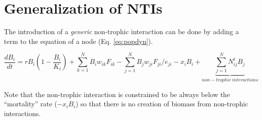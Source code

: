 \documentclass[a4paper,11pt]{article}
\begin{document}
  
  \section{Generalization of NTIs}
    
    The introduction of a \emph{generic} non-trophic interaction can be done 
by adding a term to the equation of a node (Eq. \ref{eq:popdyn}).
    
  \begin{equation}
    \label{eq:popdynt}
    \frac{dB_i}{dt} = rB_i(1 - \frac{B_i}{K_i})
                      + \sum_{k=1}^{N} B_i w_{ik} F_{ik}
                      - \sum_{j=1}^{N} B_j w_{ji} F_{ji} / e_{ji}
                      - x_i B_i 
                      + \underbrace{\sum_{j=1}^{N} N^t_{ij} B_j}_{non-trophic\ interactions}
  \end{equation}
    
    Note that the non-trophic interaction is constrained to be always below the 
``mortality'' rate ($- x_i B_i$) so that there is no creation of biomass from 
non-trophic interactions.
    
  \newpage
%   
%   
  
  \newpage
  \begin{footnotesize}
    \printbibliography
  \end{footnotesize}
  
\end{document}
